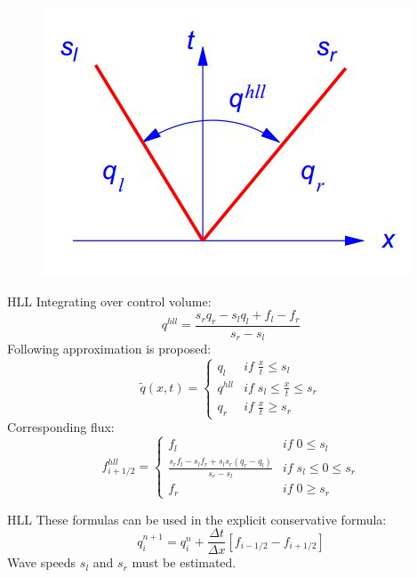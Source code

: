 	
\begin{frame}		
\begin{figure}
\centering
\includegraphics[width=0.9\linewidth]{../../figs/hll_fig}
\label{fig:hll_fig}
\end{figure}
\end{frame}

\begin{frame}{HLL}
	Integrating over control volume:
	\begin{equation*}
	q^{hll} = \frac{s_r q_r - s_l q_l + f_l - f_r}{s_r-s_l}
	\end{equation*}	
	Following approximation is proposed:
	\begin{equation*}
	\tilde{q}(x,t) = \left\{ \begin{matrix} q_l & if \; \frac{x}{t} \leq s_l \\ q^{hll} & if \;  s_l \leq \frac{x}{t} \leq s_r \\ q_r & if \; \frac{x}{t} \geq s_r \end{matrix}\right.
	\end{equation*}
	Corresponding flux:
	\begin{equation*}
	f_{i+1/2}^{hll} = \left\{ \begin{matrix} f_l & if \; 0 \leq s_l \\ \frac{s_r f_l - s_l f_r + s_l s_r (q_r - q_l)}{s_r - s_l}	 & if \;  s_l \leq 0 \leq s_r \\ f_r & if \; 0 \geq s_r \end{matrix}\right.
	\end{equation*}
\end{frame}

\begin{frame}{HLL}
	These formulas can be used in the explicit conservative formula:
	\begin{equation*}
	q_i^{n+1} = q_i^n + \frac{\Delta t}{\Delta x} \left[ f_{i-1/2} - f_{i+1/2} \right]
	\end{equation*}	
	Wave speeds $s_l$ and $s_r$ must be estimated.
\end{frame}


